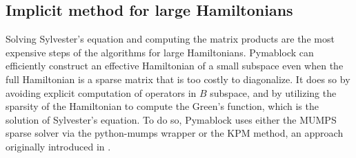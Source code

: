 \subsection{Implicit method for large Hamiltonians}

Solving Sylvester's equation and computing the matrix products are the most
expensive steps of the algorithms for large Hamiltonians.
Pymablock can efficiently construct an effective Hamiltonian of a small
subspace even when the full Hamiltonian is a sparse matrix that is too costly to
diagonalize.
It does so by avoiding explicit computation of operators in $B$ subspace, and
by utilizing the sparsity of the Hamiltonian to compute the Green's function,
which is the solution of Sylvester's equation.
To do so, Pymablock uses either the MUMPS sparse solver via the python-mumps
wrapper or the KPM method, an approach originally introduced in
\cite{Irfan_2019}.
